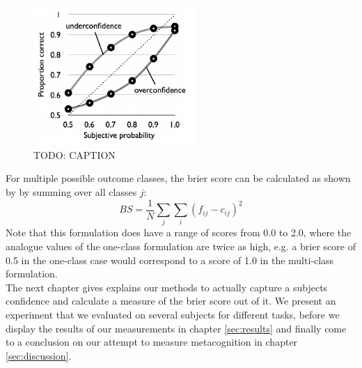 \documentclass[../main/main.tex]{subfiles}
\begin{document}
	\begin{figure}[H]
		\centering
		\captionsetup{justification=centering}
		\includegraphics[width=0.55\textwidth]{../assets/calibration_curve.png}
		\caption{TODO: CAPTION} 
		\label{fig:calibration}
	\end{figure}
	For multiple possible outcome classes, the brier score can be calculated as shown by \cite{brier1950verification} by summing over all classes $j$:
	\begin{displaymath}
		BS = \frac{1}{N}\sum_j\sum_i(f_{ij} - c_{ij})^2
	\end{displaymath}
	Note that this formulation does have a range of scores from 0.0 to 2.0, where the analogue values of the one-class formulation are twice as high, e.g. a brier score of 0.5 in the one-class case would correspond to a score of 1.0 in the multi-class formulation.\\
	The next chapter gives explains our methods to actually capture a subjects confidence and calculate a measure of the brier score out of it. We present an experiment that we evaluated on several subjects for different tasks, before we display the results of our measurements in chapter \ref{sec:results} and finally come to a conclusion on our attempt to measure metacognition in chapter \ref{sec:discussion}.
	
\end{document}
